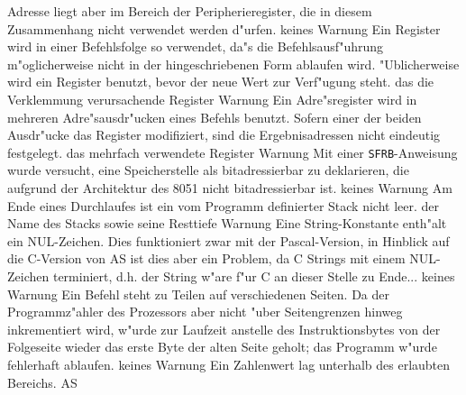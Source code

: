 \documentclass[12pt,a4paper,twoside]{report}
\newcommand{\tty}[1]{{\tt #1}}
\newcommand{\asname}{AS}
\begin{document}
\begin{description}
{                Adresse liegt aber im Bereich der Peripherieregister, die in
                diesem Zusammenhang nicht verwendet werden d"urfen.}
               {keines}
               {Warnung}
               {Ein Register wird in einer Befehlsfolge so
                verwendet, da"s die Befehlsausf"uhrung m"oglicherweise nicht
                in der hingeschriebenen Form ablaufen wird.  "Ublicherweise
                wird ein Register benutzt, bevor der neue Wert zur Verf"ugung
                steht.}
               {das die Verklemmung verursachende Register}
               {Warnung}
               {Ein Adre"sregister wird in mehreren
                Adre"sausdr"ucken eines Befehls benutzt.  Sofern einer der
                beiden Ausdr"ucke das Register modifiziert, sind die
                Ergebnisadressen nicht eindeutig festgelegt.}
               {das mehrfach verwendete Register}
               {Warnung}
               {Mit einer \tty{SFRB}-Anweisung wurde
                versucht, eine Speicherstelle als bitadressierbar zu
                deklarieren, die aufgrund der Architektur des 8051 nicht
                bitadressierbar ist.}
               {keines}
               {Warnung}
               {Am Ende eines Durchlaufes ist ein vom
                Programm definierter Stack nicht leer.}
               {der Name des Stacks sowie seine Resttiefe}
	       {Warnung}
	       {Eine String-Konstante enth"alt ein
                NUL-Zeichen. Dies funktioniert zwar mit der Pascal-Version,
                in Hinblick auf die C-Version von \asname{} ist dies aber ein Problem,
                da C Strings mit einem NUL-Zeichen terminiert, d.h. der String
                w"are f"ur C an dieser Stelle zu Ende...}
	       {keines}
	       {Warnung}
	       {Ein Befehl steht zu Teilen auf
                verschiedenen Seiten.  Da der Programmz"ahler des Prozessors
                aber nicht "uber Seitengrenzen hinweg inkrementiert wird,
                w"urde zur Laufzeit anstelle des Instruktionsbytes von der
                Folgeseite wieder das erste Byte der alten Seite geholt; das
                Programm w"urde fehlerhaft ablaufen.}
	       {keines}
               {Warnung}
               {Ein Zahlenwert lag unterhalb des erlaubten Bereichs.  \asname{}
}
\end{description}
\end{document}
